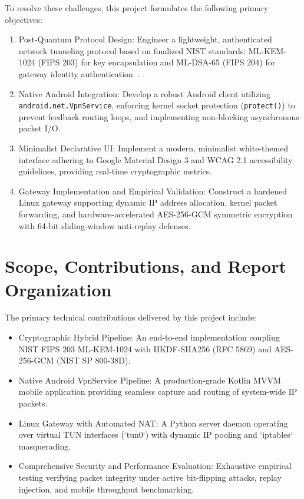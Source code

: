 To resolve these challenges, this project formulates the following primary objectives:
\begin{enumerate}
    \item Post-Quantum Protocol Design: Engineer a lightweight, authenticated network tunneling protocol based on finalized NIST standards: ML-KEM-1024 (FIPS 203) for key encapsulation and ML-DSA-65 (FIPS 204) for gateway identity authentication~\cite{nist_fips_203,nist_fips_204}.
    \item Native Android Integration: Develop a robust Android client utilizing \texttt{android.\allowbreak net.\allowbreak VpnService}, enforcing kernel socket protection (\texttt{protect()}) to prevent feedback routing loops, and implementing non-blocking asynchronous packet I/O.
    \item Minimalist Declarative UI: Implement a modern, minimalist white-themed interface adhering to Google Material Design 3 and WCAG 2.1 accessibility guidelines, providing real-time cryptographic metrics.
    \item Gateway Implementation and Empirical Validation: Construct a hardened Linux gateway supporting dynamic IP address allocation, kernel packet forwarding, and hardware-accelerated AES-256-GCM symmetric encryption with 64-bit sliding-window anti-replay defenses.
\end{enumerate}

\section{Scope, Contributions, and Report Organization}
\label{sec:scope_contributions}

The primary technical contributions delivered by this project include:
\begin{itemize}
    \item Cryptographic Hybrid Pipeline: An end-to-end implementation coupling NIST FIPS 203 ML-KEM-1024 with HKDF-SHA256 (RFC 5869) and AES-256-GCM (NIST SP 800-38D).
    \item Native Android VpnService Pipeline: A production-grade Kotlin MVVM mobile application providing seamless capture and routing of system-wide IP packets.
    \item Linux Gateway with Automated NAT: A Python server daemon operating over virtual TUN interfaces (`tun0`) with dynamic IP pooling and `iptables` masquerading.
    \item Comprehensive Security and Performance Evaluation: Exhaustive empirical testing verifying packet integrity under active bit-flipping attacks, replay injection, and mobile throughput benchmarking.
\end{itemize}

